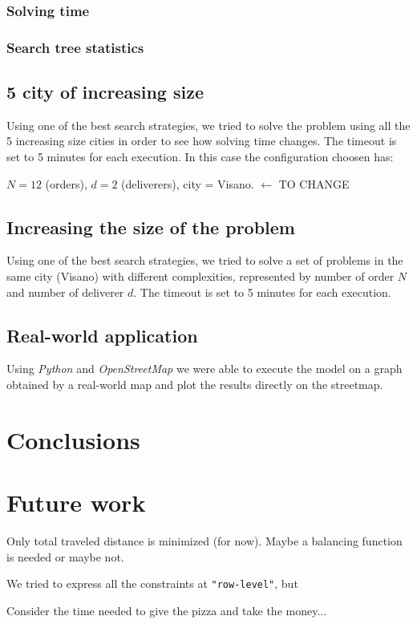 \documentclass[10pt]{article}
\begin{document}
	\subsubsection{Solving time}

	\subsubsection{Search tree statistics}

	\subsection{5 city of increasing size}
	\label{subsec:test-5-cities}
	Using one of the best search strategies, we tried to solve the problem using all the 5 increasing 
	size cities in order to see how solving time changes. The timeout is set to 5 minutes for each execution.
	In this case the configuration choosen has:
	\begin{center}
		$N = 12$ (orders), $d = 2$ (deliverers), city = Visano.	$\leftarrow$ TO CHANGE
	\end{center}


	\subsection{Increasing the size of the problem}
	\label{subsec:test-size-of-problem}
	Using one of the best search strategies, we tried to solve a set of problems in the same city (Visano)
	with different complexities, represented by number of order $N$ and number of deliverer $d$. 
	The timeout is set to 5 minutes for each execution.
	
	\subsection{Real-world application}

	Using \textit{Python} and \textit{OpenStreetMap} we were able to execute the model
	on a graph obtained by a real-world map and plot the results directly on the streetmap.
	
	

	\section{Conclusions}


	\section{Future work}
	\label{Future work}
	Only total traveled distance is minimized (for now). Maybe a balancing 
	function is needed or maybe not.

	We tried to express all the constraints at \texttt{"row-level"}, but 

	Consider the time needed to give the pizza and take the money... 
\end{document}
